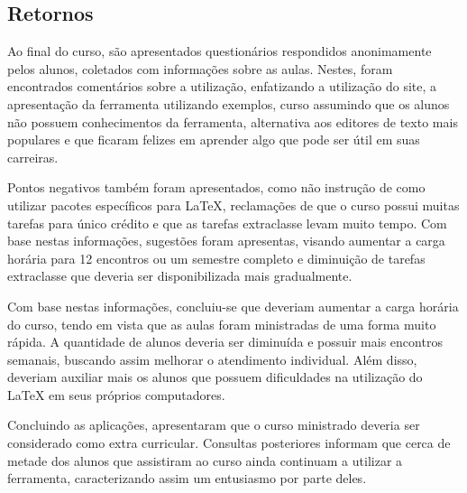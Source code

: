 \documentclass{article}
\begin{document}
\subsection{Retornos}

Ao final do curso, são apresentados questionários respondidos anonimamente pelos
alunos, coletados com informações sobre as aulas. Nestes, foram encontrados
comentários sobre a utilização, enfatizando a utilização do site, a apresentação
da ferramenta utilizando exemplos, curso assumindo que os alunos não possuem
conhecimentos da ferramenta, alternativa aos editores de texto mais populares e
que ficaram felizes em aprender algo que pode ser útil em suas carreiras.

Pontos negativos também foram apresentados, como não instrução de como utilizar
pacotes específicos para \LaTeX{}, reclamações de que o curso possui muitas
tarefas para único crédito e que as tarefas extraclasse levam muito tempo. Com
base nestas informações, sugestões foram apresentas, visando aumentar a carga
horária para 12 encontros ou um semestre completo e diminuição de tarefas
extraclasse que deveria ser disponibilizada mais gradualmente.

Com base nestas informações, concluiu-se que deveriam aumentar a carga horária
do curso, tendo em vista que as aulas foram ministradas de uma forma muito
rápida. A quantidade de alunos deveria ser diminuída e possuir mais encontros
semanais, buscando assim melhorar o atendimento individual. Além disso, deveriam
auxiliar mais os alunos que possuem dificuldades na utilização do \LaTeX{} em
seus próprios computadores.

Concluindo as aplicações, apresentaram que o curso ministrado deveria ser
considerado como extra curricular. Consultas posteriores informam que cerca de
metade dos alunos que assistiram ao curso ainda continuam a utilizar a
ferramenta, caracterizando assim um entusiasmo por parte deles.



\end{document}
